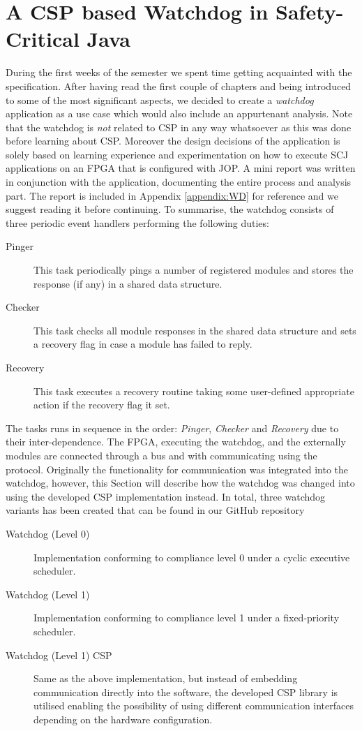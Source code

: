 \chapter{A CSP based Watchdog in Safety-Critical Java}
\label{chapter:watchdogcsp}
During the first weeks of the semester we spent time getting acquainted with the specification. After having read the first couple of chapters and being introduced to some of the most significant aspects, we decided to create a \textit{watchdog} application as a use case which would also include an appurtenant analysis. Note that the watchdog is \textit{not} related to CSP in any way whatsoever as this was done before learning about CSP. Moreover the design decisions of the application is solely based on learning experience and experimentation on how to execute SCJ applications on an FPGA that is configured with JOP. A mini report was written in conjunction with the application, documenting the entire process and analysis part. The report is included in Appendix \ref{appendix:WD} for reference and we suggest reading it before continuing. To summarise, the watchdog consists of three periodic event handlers performing the following duties:

\begin{description}
	\item[Pinger] This task periodically pings a number of registered modules and stores the response (if any) in a shared data structure.
	\item[Checker] This task checks all module responses in the shared data structure and sets a recovery flag in case a module has failed to reply.
	\item[Recovery] This task executes a recovery routine taking some user-defined appropriate action if the recovery flag it set. 
\end{description}

The tasks runs in sequence in the order: \textit{Pinger}, \textit{Checker} and \textit{Recovery} due to their inter-dependence. The FPGA, executing the watchdog, and the externally modules are connected through a bus and with communicating using the \iic protocol. Originally the functionality for \iic communication was integrated into the watchdog, however, this Section will describe how the watchdog was changed into using the developed CSP implementation instead. In total, three watchdog variants has been created that can be found in our GitHub repository~\cite{SW902e12:CSPinSCJ}

\begin{description}
	\item[Watchdog (Level 0)] Implementation conforming to compliance level 0 under a cyclic executive scheduler.
	\item[Watchdog (Level 1)] Implementation conforming to compliance level 1 under a fixed-priority scheduler. 
	\item[Watchdog (Level 1) CSP] Same as the above implementation, but instead of embedding \iic communication directly into the software, the developed CSP library is utilised enabling the possibility of using different communication interfaces depending on the hardware configuration.
\end{description}

